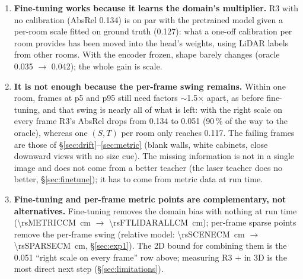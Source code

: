 \begin{enumerate}
\item \textbf{Fine-tuning works because it learns the domain's multiplier.} R3 with no calibration (AbsRel 0.134) is on
par with the pretrained model given a per-room scale fitted on ground truth (0.127): what a one-off calibration per room
provides has been moved into the head's weights, using LiDAR labels from other rooms. With the encoder frozen, shape
barely changes (oracle 0.035 $\rightarrow$ 0.042); the whole gain is scale.
\item \textbf{It is not enough because the per-frame swing remains.} Within one room, frames at p5 and p95 still need
factors $\sim$1.5$\times$ apart, as before fine-tuning, and that swing is nearly all of what is left: with the right
scale on every frame R3's AbsRel drops from 0.134 to 0.051 (90\,\% of the way to the oracle), whereas one $(S,T)$ per
room only reaches 0.117. The failing frames are those of \S\ref{sec:drift}--\ref{sec:metric} (blank walls, white
cabinets, close downward views with no size cue). The missing information is not in a single image and does not come
from a better teacher (the laser teacher does no better, \S\ref{sec:finetune}); it has to come from metric data at run
time.
\item \textbf{Fine-tuning and per-frame metric points are complementary, not alternatives.} Fine-tuning removes the
domain bias with nothing at run time (\SI{\rsMETRICCM}{cm} $\rightarrow$ \SI{\rsFTLIDARALLCM}{cm}); per-frame sparse
points remove the per-frame swing (relative model: \SI{\rsSCENECM}{cm} $\rightarrow$ \SI{\rsSPARSECM}{cm},
\S\ref{sec:exp1}). The 2D bound for combining them is the 0.051 ``right scale on every frame'' row above; measuring
R3 $+$  in 3D is the most direct next step (\S\ref{sec:limitations}).
\end{enumerate}

